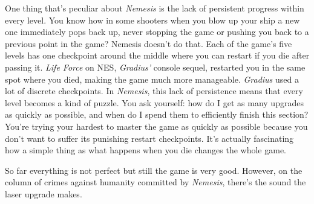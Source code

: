 \documentclass{book}
\begin{document}
\begin{minipage}{0.45\linewidth}\end{minipage}\vspace{2pt}
\begin{minipage}{0.45\linewidth}\end{minipage}
\par\justifying
One thing that’s peculiar about \emph{Nemesis} is the lack of persistent progress within every level. You know how in some shooters when you blow up your ship a new one immediately pops back up, never stopping the game or pushing you back to a previous point in the game? Nemesis doesn’t do that. Each of the game’s five levels has one checkpoint around the middle where you can restart if you die after passing it. \emph{Life Force} on NES, \emph{Gradius’} console sequel, restarted you in the same spot where you died, making the game much more manageable. \emph{Gradius} used a lot of discrete checkpoints. In \emph{Nemesis}, this lack of persistence means that every level becomes a kind of puzzle. You ask yourself: how do I get as many upgrades as quickly as possible, and when do I spend them to efficiently finish this section? You’re trying your hardest to master the game as quickly as possible because you don’t want to suffer its punishing restart checkpoints. It’s actually fascinating how a simple thing as what happens when you die changes the whole game.\par
So far everything is not perfect but still the game is very good. However, on the column of crimes against humanity committed by \emph{Nemesis}, there’s the sound the laser upgrade makes.\par
\end{document}
